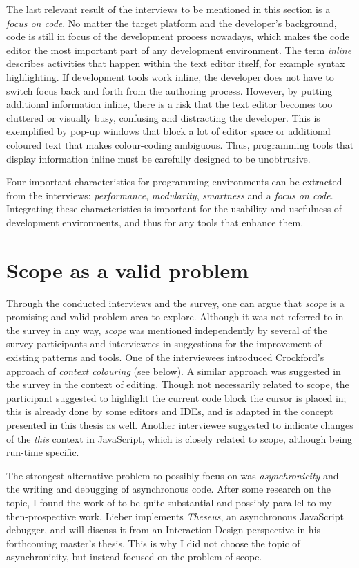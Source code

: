 The last relevant result of the interviews to be mentioned in this
section is a \emph{focus on code}. No matter the target platform and the
developer’s background, code is still in focus of the development
process nowadays, which makes the code editor the most important part of
any development environment. The term \emph{inline} describes activities
that happen within the text editor itself, for example syntax
highlighting. If development tools work inline, the developer does not
have to switch focus back and forth from the authoring process. However,
by putting additional information inline, there is a risk that the text
editor becomes too cluttered or visually busy, confusing and distracting
the developer. This is exemplified by pop-up windows that block a lot of
editor space or additional coloured text that makes colour-coding
ambiguous. Thus, programming tools that display information inline must
be carefully designed to be unobtrusive.

Four important characteristics for programming environments can be
extracted from the interviews: \emph{performance}, \emph{modularity},
\emph{smartness} and a \emph{focus on code}. Integrating these
characteristics is important for the usability and usefulness of
development environments, and thus for any tools that enhance them.

\section{Scope as a valid problem}\label{scope-as-a-valid-problem}

Through the conducted interviews and the survey, one can argue that
\emph{scope} is a promising and valid problem area to explore. Although
it was not referred to in the survey in any way, \emph{scope} was
mentioned independently by several of the survey participants and
interviewees in suggestions for the improvement of existing patterns and
tools. One of the interviewees introduced Crockford’s
\citeyear{crockford} approach of \emph{context colouring} (see below). A
similar approach was suggested in the survey in the context of editing.
Though not necessarily related to scope, the participant suggested to
highlight the current code block the cursor is placed in; this is
already done by some editors and IDEs, and is adapted in the concept
presented in this thesis as well. Another interviewee suggested to
indicate changes of the \emph{this} context in JavaScript, which is
closely related to scope, although being run-time specific.

The strongest alternative problem to possibly focus on was
\emph{asynchronicity} and the writing and debugging of asynchronous
code. After some research on the topic, I found the work of
 to be quite substantial and possibly parallel to my
then-prospective work. Lieber implements \emph{Theseus}, an asynchronous
JavaScript debugger, and will discuss it from an Interaction Design
perspective in his forthcoming master’s thesis. This is why I did not
choose the topic of asynchronicity, but instead focused on the problem
of scope.
